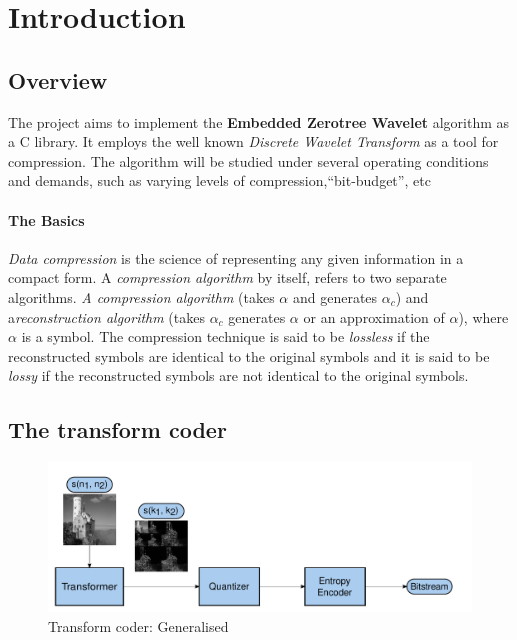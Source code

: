 \documentclass[./A14_Report.tex]{subfiles}
\begin{document}
\chapter{Introduction}
\section{Overview}
\label{sec:overview}

The project aims to implement the \textbf{Embedded Zerotree Wavelet} algorithm
as a C library. It employs the well known \textit{Discrete Wavelet Transform}
as a tool for compression. The algorithm will be studied under several
operating conditions and demands, such as varying levels of
compression,``bit-budget'', etc

\subsubsection{The Basics}%
\label{sec:the_basics}

\textit{Data compression} is the science of representing any given information
in a compact form. A \textit{compression algorithm} by itself, refers to two separate 
algorithms. \textit{A compression algorithm} (takes $\alpha$ and generates $\alpha_c$) 
and a\textit {reconstruction algorithm} (takes $\alpha_c$ generates $\alpha$ or an approximation of $\alpha$), 
where $\alpha$ is a symbol. The compression technique is said 
to be \textit{lossless} if the reconstructed symbols are identical to the original symbols 
and it is said to be \textit{lossy} if the  reconstructed symbols are not identical to the original symbols.

\section{The transform coder}
\label{sec:the_transform_coder}

\begin{figure}[h]
    \centering
    \includegraphics[scale=0.5]{../img/block-diag_shrunk.pdf}
    \caption{Transform coder: Generalised \cite{shap1993}}
    \label{fig:tcoder}
\end{figure}
\end{document}
